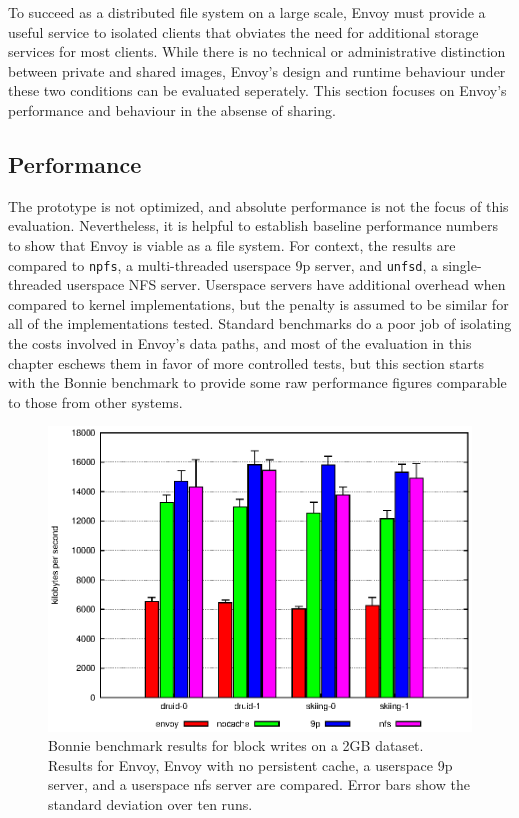 To succeed as a distributed file system on a large scale, Envoy must provide a useful service to isolated clients that obviates the need for additional storage services for most clients. While there is no technical or administrative distinction between private and shared images, Envoy's design and runtime behaviour under these two conditions can be evaluated seperately. This section focuses on Envoy's performance and behaviour in the absense of sharing.

\subsection{Performance}

The prototype is not optimized, and absolute performance is not the focus of this evaluation. Nevertheless, it is helpful to establish baseline performance numbers to show that Envoy is viable as a file system. For context, the results are compared to \texttt{npfs}, a multi-threaded userspace 9p server, and \texttt{unfsd}, a single-threaded userspace NFS server. Userspace servers have additional overhead when compared to kernel implementations, but the penalty is assumed to be similar for all of the implementations tested. Standard benchmarks do a poor job of isolating the costs involved in Envoy's data paths, and most of the evaluation in this chapter eschews them in favor of more controlled tests, but this section starts with the Bonnie benchmark to provide some raw performance figures comparable to those from other systems.

\begin{figure}[t]
\centering
\includegraphics[width=\figwidth]{figures/bonnie-write}
\caption[Bonnie benchmark results for block writes]{Bonnie benchmark results for block writes on a 2GB dataset. Results for Envoy, Envoy with no persistent cache, a userspace 9p server, and a userspace nfs server are compared. Error bars show the standard deviation over ten runs.}
\label{fig:bonnie-write}
\end{figure}

